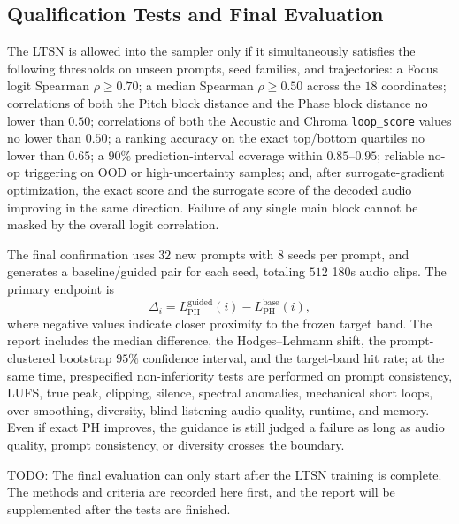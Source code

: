 \documentclass{article}
\begin{document}
\subsection{Qualification Tests and Final Evaluation}

The LTSN is allowed into the sampler only if it simultaneously satisfies the following thresholds on unseen prompts, seed families, and trajectories: a Focus logit Spearman $\rho\geq0.70$; a median Spearman $\rho\geq0.50$ across the $18$ coordinates; correlations of both the Pitch block distance and the Phase block distance no lower than $0.50$; correlations of both the Acoustic and Chroma \texttt{loop\_score} values no lower than $0.50$; a ranking accuracy on the exact top/bottom quartiles no lower than $0.65$; a $90\%$ prediction-interval coverage within $0.85$--$0.95$; reliable no-op triggering on OOD or high-uncertainty samples; and, after surrogate-gradient optimization, the exact score and the surrogate score of the decoded audio improving in the same direction. Failure of any single main block cannot be masked by the overall logit correlation.

The final confirmation uses $32$ new prompts with $8$ seeds per prompt, and generates a baseline/guided pair for each seed, totaling $512$ 180s audio clips. The primary endpoint is
\begin{equation}
\Delta_i=L_{\mathrm{PH}}^{\mathrm{guided}}(i)
-L_{\mathrm{PH}}^{\mathrm{base}}(i),
\end{equation}
where negative values indicate closer proximity to the frozen target band. The report includes the median difference, the Hodges--Lehmann shift, the prompt-clustered bootstrap $95\%$ confidence interval, and the target-band hit rate; at the same time, prespecified non-inferiority tests are performed on prompt consistency, LUFS, true peak, clipping, silence, spectral anomalies, mechanical short loops, over-smoothing, diversity, blind-listening audio quality, runtime, and memory. Even if exact PH improves, the guidance is still judged a failure as long as audio quality, prompt consistency, or diversity crosses the boundary.

\begin{tcolorbox}[colback=yellow!30,colframe=yellow!60,boxrule=0.5pt,arc=6pt,left=6pt,right=6pt,top=4pt,bottom=4pt]
TODO: The final evaluation can only start after the LTSN training is complete. The methods and criteria are recorded here first, and the report will be supplemented after the tests are finished.
\end{tcolorbox}
\end{document}
